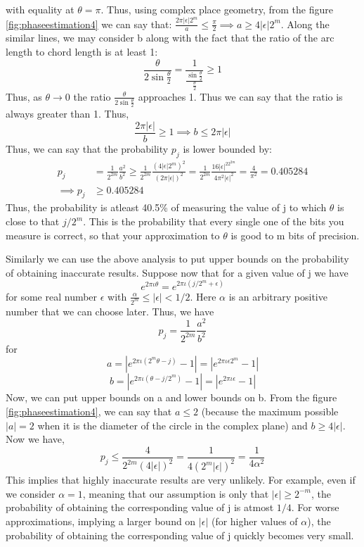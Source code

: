 with equality at $\theta=\pi$. Thus, using complex place geometry, from the figure \ref{fig:phaseestimation4} we can say that: $\frac{2\pi|\epsilon|2^m}{a}\leq\frac{\pi}{2} \implies a\geq 4|\epsilon|2^m$.
Along the similar lines, we may consider b along with the fact that the ratio of the arc length to chord length is at least 1:
\[
    \frac{\theta}{2\sin \frac{\theta}{2}}=\dfrac{1}{\frac{\sin \frac{\theta}{2}}{\frac{\theta}{2}}}\geq 1
\]
Thus, as $\theta \rightarrow 0$ the ratio $\frac{\theta}{2\sin \frac{\theta}{2}}$ approaches 1.
Thus we can say that the ratio is always greater than 1. Thus,
\[
\dfrac{2\pi|\epsilon|}{b}\geq 1 \implies b \leq 2\pi|\epsilon|
\]
Thus, we can say that the probability $p_j$ is lower bounded by:
\begin{align*}
p_j&=\frac{1}{2^{2m}}\frac{a^2}{b^2}\geq \frac{1}{2^{2m}}\frac{(4|\epsilon|2^m)^2}{(2\pi|\epsilon|)^2}=\frac{1}{2^{2m}}\frac{16|\epsilon|^22^{2m}}{4\pi^2|\epsilon|^2}=\frac{4}{\pi^2}=0.405284\\
\implies p_j&\geq 0.405284
\end{align*}
Thus, the probability is atleast 40.5\% of measuring the value of j to which $\theta$ is close to that $j/2^m$. This is the probability that every single one of the bits you measure is correct, so that your approximation to $\theta$ is
good to m bits of precision.

Similarly we can use the above analysis to put upper bounds on the probability of obtaining inaccurate results. Suppose now that for a given value of j we have
\[
e^{2\pi\iota \theta}=e^{2\pi\iota(j/2^m+\epsilon)}
\]
for some real number $\epsilon$ with $\frac{\alpha}{2^m}\leq |\epsilon|<1/2$. Here $\alpha$ is an arbitrary positive number that we can choose later.
Thus, we have
\[
p_j=\frac{1}{2^{2m}}\frac{a^2}{b^2}
\]
for
\[
a=|e^{2\pi\iota(2^m\theta-j)}-1|=|e^{2\pi\iota\epsilon 2^m}-1|
\]
\[
b=|e^{2\pi\iota(\theta-j/2^m)}-1|=|e^{2\pi\iota\epsilon}-1|
\]
Now, we can put upper bounds on a and lower bounds on b. From the figure \ref{fig:phaseestimation4},
we can say that $a\leq2$ (because the maximum possible $|a|=2$ when it is the diameter of the circle in the complex plane) and $b\geq 4|\epsilon|$. Now we have,
\[p_j\leq \frac{4}{2^{2m}(4|\epsilon|)^2}=\frac{1}{4(2^m|\epsilon|)^2}=\frac{1}{4\alpha^2}\]
This implies that highly inaccurate results are very unlikely. For example, even if we consider $\alpha=1$, meaning that our assumption is only that $|\epsilon|\geq 2^{-m}$, the probability of 
obtaining the corresponding value of j is atmost $1/4$. For worse approximations, implying a larger bound on $|\epsilon|$ (for higher values of $\alpha$), the probability of obtaining the corresponding value of j quickly becomes very small.

